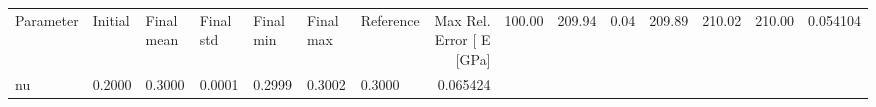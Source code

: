 \begin{tabular}{lllllllr}
\toprule
Parameter & Initial & Final mean & Final std & Final min & Final max & Reference & Max Rel. Error [%
\midrule
E [GPa] & 100.00 & 209.94 & 0.04 & 209.89 & 210.02 & 210.00 & 0.054104 \\
nu & 0.2000 & 0.3000 & 0.0001 & 0.2999 & 0.3002 & 0.3000 & 0.065424 \\
\bottomrule
\end{tabular}
